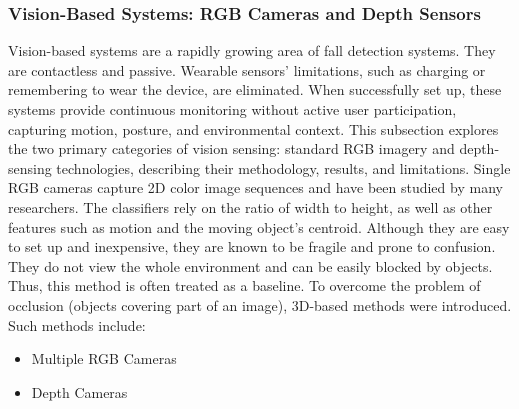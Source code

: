 \documentclass[11pt, a4paper, twoside]{article}
\begin{document}
\subsubsection{Vision-Based Systems: RGB Cameras and Depth Sensors}
Vision-based systems are a rapidly growing area of fall detection systems. They are contactless and passive.  Wearable sensors' limitations, such as charging or remembering to wear the device, are eliminated. When successfully set up, these systems provide continuous monitoring without active user participation, capturing motion, posture, and environmental context. This subsection explores the two primary categories of vision sensing: standard RGB imagery and depth-sensing technologies, describing their methodology, results, and limitations.
\newline
\newline
Single RGB cameras capture 2D color image sequences and have been studied by many researchers. The classifiers rely on the ratio of width to height, as well as other features such as motion and the moving object's centroid. Although they are easy to set up and inexpensive, they are known to be fragile and prone to confusion. They do not view the whole environment and can be easily blocked by objects. Thus, this method is often treated as a baseline. To overcome the problem of occlusion (objects covering part of an image), 3D-based methods were introduced. Such methods include:

\begin{itemize}
    \item Multiple RGB Cameras
    \item Depth Cameras
\end{itemize}
\end{document}
